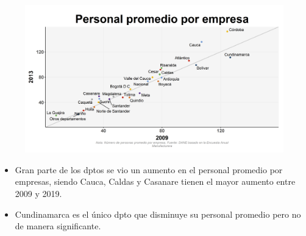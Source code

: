     \begin{figure}[H]
        \caption[Personal promedio por empresa por departamentos - 2009 VS 2019 ]{\label{personal_promedio_dptos_vs} }
        \begin{center}
        \includegraphics[width=\textwidth,keepaspectratio]{img/var_220_scatter_time.png}
        \end{center}
    \end{figure}
            \begin{itemize}
                    \item Gran parte de los dptos se vio un aumento en el personal promedio por empresas, siendo Cauca, Caldas y Casanare tienen el mayor aumento entre 2009 y 2019.
                    \item Cundinamarca es el único dpto que disminuye su personal promedio pero no de manera significante.
                    \end{itemize}


